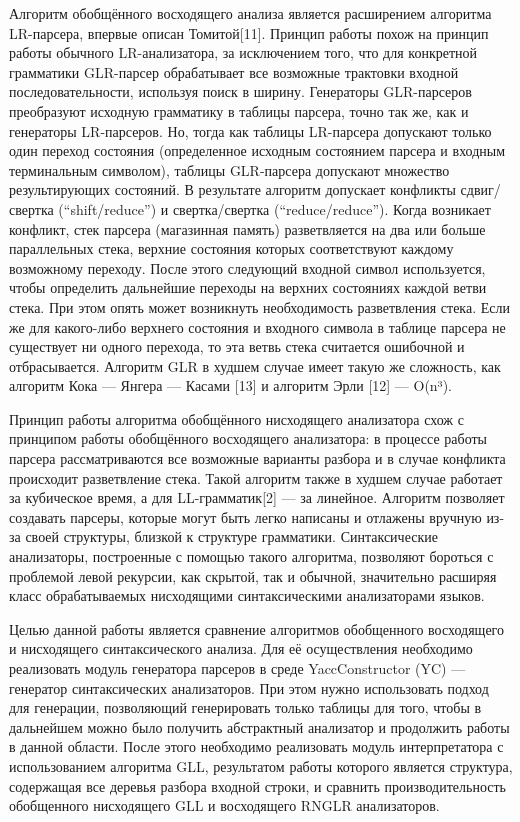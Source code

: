 Алгоритм обобщённого восходящего анализа является расширением алгоритма LR-парсера, впервые описан Томитой[11]. Принцип работы похож на принцип работы обычного LR-анализатора, за исключением того, что для конкретной грамматики GLR-парсер обрабатывает все возможные трактовки входной последовательности, используя поиск в ширину. Генераторы GLR-парсеров преобразуют исходную грамматику в таблицы парсера, точно так же, как и генераторы LR-парсеров. Но, тогда как таблицы LR-парсера допускают только один переход состояния (определенное исходным состоянием парсера и входным терминальным символом), таблицы GLR-парсера допускают множество результирующих состояний. В результате алгоритм допускает конфликты сдвиг/свертка (“shift/reduce”) и свертка/свертка (“reduce/reduce”). Когда возникает конфликт, стек парсера (магазинная память) разветвляется на два или больше параллельных стека, верхние состояния которых соответствуют каждому возможному переходу. После этого следующий входной символ используется, чтобы определить дальнейшие переходы на верхних состояниях каждой ветви стека. При этом опять может возникнуть необходимость разветвления стека. Если же для какого-либо верхнего состояния и входного символа в таблице парсера не существует ни одного перехода, то эта ветвь стека считается ошибочной и отбрасывается. Алгоритм GLR в худшем случае имеет такую же сложность, как алгоритм Кока --- Янгера --- Касами [13] и алгоритм Эрли [12] --- O(n³).

Принцип работы алгоритма обобщённого нисходящего анализатора схож с принципом работы обобщённого восходящего анализатора: в процессе работы парсера рассматриваются все возможные варианты разбора и в случае конфликта происходит разветвление стека. Такой алгоритм также в худшем случае работает за кубическое время, а для LL-грамматик[2] --- за линейное. Алгоритм позволяет создавать парсеры, которые могут быть легко написаны и отлажены вручную из-за своей структуры, близкой к структуре грамматики. Синтаксические анализаторы, построенные с помощью такого алгоритма, позволяют бороться с проблемой левой рекурсии, как скрытой, так и обычной, значительно расширяя класс обрабатываемых нисходящими синтаксическими анализаторами языков.

Целью данной работы является сравнение алгоритмов обобщенного восходящего и нисходящего синтаксического анализа. Для её осуществления необходимо реализовать модуль генератора парсеров в среде YaccConstructor (YC) --- генератор синтаксических анализаторов. При этом нужно использовать подход для генерации, позволяющий генерировать только таблицы для того, чтобы в дальнейшем можно было получить абстрактный анализатор и продолжить работы в данной области. После этого необходимо реализовать модуль интерпретатора с использованием алгоритма GLL, результатом работы которого является структура, содержащая все деревья разбора входной строки, и сравнить производительность обобщенного нисходящего GLL и восходящего RNGLR анализаторов.
